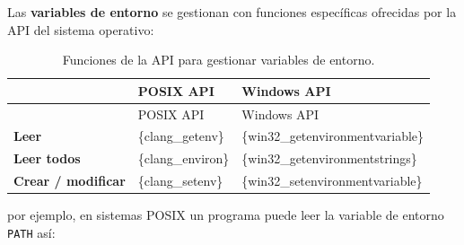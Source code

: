 Las \textbf{variables de entorno} se gestionan con funciones específicas
ofrecidas por la API del sistema operativo:

\begin{longtable}[]{@{}
  >{\raggedright\arraybackslash}p{}
  >{\raggedright\arraybackslash}p{}
  >{\raggedright\arraybackslash}p{}@{}}
\caption{Funciones de la API para gestionar variables de
entorno.}\tabularnewline
\toprule\noalign{}
\begin{minipage}[b]{\linewidth}\raggedright
\end{minipage} & \begin{minipage}[b]{\linewidth}\raggedright
POSIX API
\end{minipage} & \begin{minipage}[b]{\linewidth}\raggedright
Windows API
\end{minipage} \\
\midrule\noalign{}
\endfirsthead
\toprule\noalign{}
\begin{minipage}[b]{\linewidth}\raggedright
\end{minipage} & \begin{minipage}[b]{\linewidth}\raggedright
POSIX API
\end{minipage} & \begin{minipage}[b]{\linewidth}\raggedright
Windows API
\end{minipage} \\
\midrule\noalign{}
\endhead
\bottomrule\noalign{}
\endlastfoot
\textbf{Leer} & \{clang\_getenv\} & \{win32\_getenvironmentvariable\} \\
\textbf{Leer todos} & \{clang\_environ\} &
\{win32\_getenvironmentstrings\} \\
\textbf{Crear / modificar} & \{clang\_setenv\} &
\{win32\_setenvironmentvariable\} \\
\end{longtable}

por ejemplo, en sistemas POSIX un programa puede leer la variable de
entorno \texttt{PATH} así:

\begin{Shaded}
\begin{Highlighting}[]
\OperatorTok{*}\OperatorTok{=}\OperatorTok{(}\OperatorTok{);}
\end{Highlighting}
\end{Shaded}

